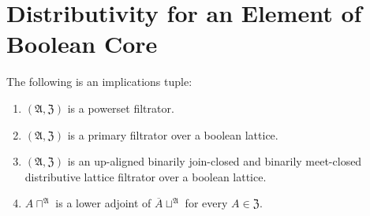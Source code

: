 \section{Distributivity for an Element of Boolean Core}
\begin{lem}
\label{bb-bool-adj}The following is an implications tuple:
\begin{enumerate}
\item \label{bool-adj-p}$(\mathfrak{A},\mathfrak{Z})$ is a powerset filtrator.
\item \label{bool-adj-f}$(\mathfrak{A},\mathfrak{Z})$ is a primary filtrator
over a boolean lattice.
\item \label{bool-adj-fltr}$(\mathfrak{A},\mathfrak{Z})$ is an up-aligned
binarily join-closed and binarily meet-closed distributive lattice
filtrator over a boolean lattice.
\item \label{bool-adj-conc}$A\sqcap^{\mathfrak{A}}$ is a lower adjoint
of $\overline{A}\sqcup^{\mathfrak{A}}$ for every $A\in\mathfrak{Z}$.
\end{enumerate}
\end{lem}

